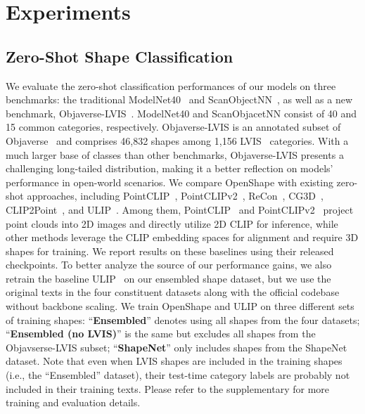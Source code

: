 \vspace{-0.7em}
\section{Experiments}
\vspace{-0.7em}
\subsection{Zero-Shot Shape Classification}
\vspace{-0.7em}

We evaluate the zero-shot classification performances of our models on three benchmarks: the traditional ModelNet40~\cite{wu20153d} and ScanObjectNN~\cite{uy2019revisiting}, as well as a new benchmark, Objaverse-LVIS~\cite{objaverse}. ModelNet40 and ScanObjacetNN consist of 40 and 15 common categories, respectively. Objaverse-LVIS is an annotated subset of Objaverse~\cite{objaverse} and comprises 46,832 shapes among 1,156 LVIS~\cite{gupta2019lvis} categories. With a much larger base of classes than other benchmarks, Objaverse-LVIS presents a challenging long-tailed distribution, making it a better reflection on models' performance in open-world scenarios. We compare OpenShape with existing zero-shot approaches, including PointCLIP~\cite{zhang2022pointclip}, PointCLIPv2~\cite{zhu2022pointclipv2}, ReCon~\cite{qi2023contrast}, CG3D~\cite{hegde2023clip}, CLIP2Point~\cite{huang2022clip2point}, and ULIP~\cite{xue2022ulip}. Among them, PointCLIP~\cite{zhang2022pointclip} and PointCLIPv2~\cite{zhu2022pointclipv2} project point clouds into 2D images and directly utilize 2D CLIP for inference, while other methods leverage the CLIP embedding spaces for alignment and require 3D shapes for training. We report results on these baselines using their released checkpoints. To better analyze the source of our performance gains, we also retrain the baseline ULIP~\cite{xue2022ulip} on our ensembled shape dataset, but we use the original texts in the four constituent datasets along with the official codebase without backbone scaling. We train OpenShape and ULIP on three different sets of training shapes: ``\textbf{Ensembled}'' denotes using all shapes from the four datasets; ``\textbf{Ensembled (no LVIS)}'' is the same but excludes all shapes from the Objavserse-LVIS subset; ``\textbf{ShapeNet}'' only includes shapes from the ShapeNet~\cite{chang2015shapenet} dataset. Note that even when LVIS shapes are included in the training shapes (i.e., the ``Ensembled'' dataset), their test-time category labels are probably not included in their training texts. Please refer to the supplementary for more training and evaluation details.



